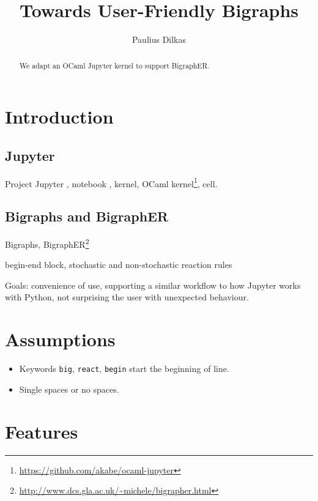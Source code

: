 \documentclass{article}
\author{Paulius Dilkas}
\title{Towards User-Friendly Bigraphs}
\begin{document}
\maketitle

\begin{abstract}
  We adapt an OCaml Jupyter kernel to support BigraphER.
\end{abstract}

\section{Introduction}

\subsection{Jupyter}

Project Jupyter \cite{website:jupyter}, notebook \cite{website:docs}, kernel,
OCaml kernel\footnote{\url{https://github.com/akabe/ocaml-jupyter}}, cell.

\subsection{Bigraphs and BigraphER}

Bigraphs,
BigraphER\footnote{\url{http://www.dcs.gla.ac.uk/~michele/bigrapher.html}}
\cite{Sevegnani2016}

begin-end block, stochastic and non-stochastic reaction rules

Goals: convenience of use, supporting a similar workflow to how Jupyter works
with Python, not surprising the user with unexpected behaviour.

\section{Assumptions}

\begin{itemize}
\item Keywords \texttt{big}, \texttt{react}, \texttt{begin} start the beginning
  of line.
\item Single spaces or no spaces.
\end{itemize}

\section{Features}
\end{document}
